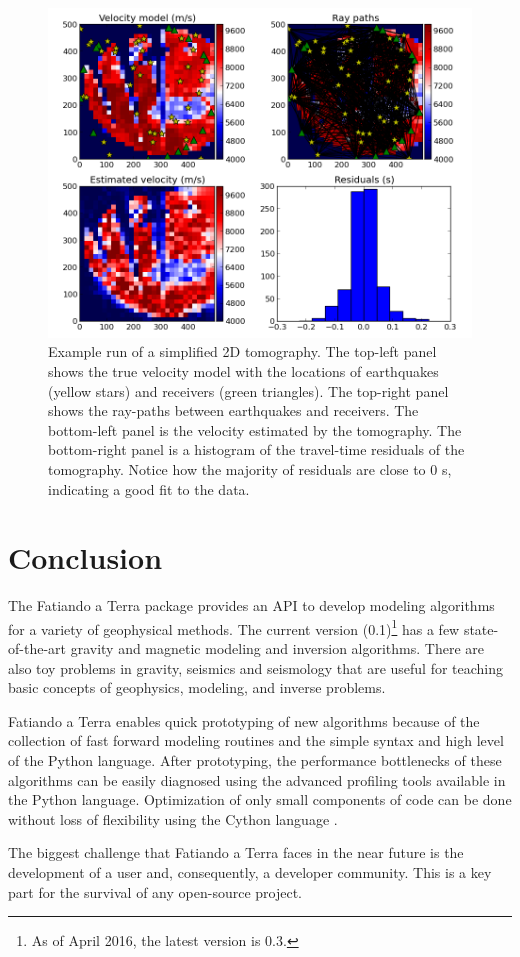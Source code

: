 \begin{figure}
    \centering
    \includegraphics[width=\textwidth]{figures/paper-fatiando/seismic_tomo}
    \caption{
        Example run of a simplified 2D tomography. The top-left panel shows the
        true velocity model with the locations of earthquakes (yellow stars)
        and receivers (green triangles). The top-right panel shows the
        ray-paths between earthquakes and receivers. The bottom-left panel is
        the velocity estimated by the tomography. The bottom-right panel is a
        histogram of the travel-time residuals of the tomography. Notice how
        the majority of residuals are close to 0 s, indicating a good fit to
        the data.
    }
    \label{fig:p1-tomo}
\end{figure}




\section{Conclusion}

The Fatiando a Terra package provides an API to develop modeling
algorithms for a variety of geophysical methods. The current version
(0.1)\footnote{
    As of April 2016, the latest version is 0.3.}
has a few state-of-the-art gravity and magnetic modeling and
inversion algorithms. There are also toy problems in gravity, seismics
and seismology that are useful for teaching basic concepts of
geophysics, modeling, and inverse problems.

Fatiando a Terra enables quick prototyping of new algorithms because of
the collection of fast forward modeling routines and the simple syntax
and high level of the Python language. After prototyping, the
performance bottlenecks of these algorithms can be easily diagnosed
using the advanced profiling tools available in the Python language.
Optimization of only small components of code can be done without loss
of flexibility using the Cython language \citep{behnel2011}.

The biggest challenge that Fatiando a Terra faces in the near future is
the development of a user and, consequently, a developer community. This
is a key part for the survival of any open-source project.

